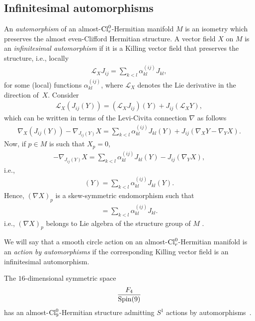 \documentclass[pdftex]{sigma}
\numberwithin{equation}{section}
\begin{document}
\subsection{Inf\/initesimal automorphisms}\label{subsec: infinitesimal automorphism}
An {\em automorphism} of an almost-${\rm Cl}_r^0$-Hermitian manifold $M$ is an isometry which preserves the almost even-Clif\/ford Hermitian structure. A vector f\/ield $X$ on $M$ is an {\em infinitesimal automorphism} if it is a Killing vector f\/ield that preserves the structure, i.e., locally
\begin{gather*}\mathcal{L}_X J_{ij} =\sum_{k<l} \alpha_{kl}^{(ij)} J_{kl},\end{gather*}
for some (local) functions $\alpha_{kl}^{(ij)}$, where $\mathcal{L}_X$ denotes the Lie derivative in the direction of~$X$. Consider
\begin{gather*}
{\mathcal L}_X(J_{ij}(Y)) = ({\mathcal L}_XJ_{ij})(Y) + J_{ij}({\mathcal L}_XY),
\end{gather*}
which can be written in terms of the Levi-Civita connection $\nabla$ as follows
\begin{gather*}
\nabla_X(J_{ij}(Y))-\nabla_{J_{ij}(Y)}X = \sum_{k<l} \alpha_{kl}^{(ij)} J_{kl}(Y)+J_{ij}(\nabla_XY-\nabla_YX).
\end{gather*}
Now, if $p\in M$ is such that $X_p=0$,
\begin{gather*}
-\nabla_{J_{ij}(Y)}X = \sum_{k<l} \alpha_{kl}^{(ij)} J_{kl}(Y)-J_{ij}(\nabla_YX),
\end{gather*}
i.e.,
\begin{gather*}
[J_{ij},\nabla X](Y) = \sum_{k<l} \alpha_{kl}^{(ij)} J_{kl}(Y).
\end{gather*}
Hence, $(\nabla X)_p$ is a skew-symmetric endomorphism such that
\begin{gather*}
[J_{ij},\nabla X] = \sum_{k<l} \alpha_{kl}^{(ij)} J_{kl}.
\end{gather*}
i.e., $(\nabla X)_p$ belongs to Lie algebra of the structure group of $M$ \cite{Arizmendi-Garcia-Herrera, Arizmendi-Herrera}.

We will say that a smooth circle action on an almost-${\rm Cl}_r^0$-Hermitian manifold is an {\em action by automorphisms} if the corresponding Killing vector f\/ield is an inf\/initesimal automorphism.

\begin{Example}
The $16$-dimensional symmetric space
\begin{gather*}{F_4\over {\rm Spin}(9)}\end{gather*}
has an almost-${\rm Cl}_9^0$-Hermitian structure admitting $S^1$ actions by automorphisms~\cite{Friedrich-weak}.
\end{Example}
\end{document}

